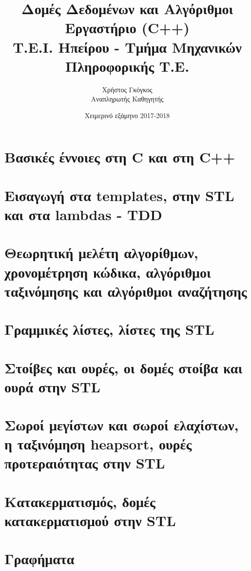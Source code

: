 \documentclass[11pt,a4paper]{book}
\title{Δομές Δεδομένων και Αλγόριθμοι \\ Εργαστήριο (C++)\\ Τ.Ε.Ι. Ηπείρου - Τμήμα Μηχανικών Πληροφορικής Τ.Ε.}
\author{Χρήστος Γκόγκος  \\ Αναπληρωτής Καθηγητής }
\date{Χειμερινό εξάμηνο 2017-2018}
\begin{document}
\frontmatter
\maketitle
\tableofcontents
\mainmatter

\chapter{Βασικές έννοιες στη C και στη C++}


\chapter{Εισαγωγή στα templates, στην STL και στα lambdas - TDD}


\chapter{Θεωρητική μελέτη αλγορίθμων, χρονομέτρηση κώδικα, αλγόριθμοι ταξινόμησης και αλγόριθμοι αναζήτησης}


\chapter{Γραμμικές λίστες, λίστες της STL}


\chapter{Στοίβες και ουρές, οι δομές στοίβα και ουρά στην STL}


\chapter{Σωροί μεγίστων και σωροί ελαχίστων, η ταξινόμηση heapsort, ουρές προτεραιότητας στην STL}


\chapter{Κατακερματισμός, δομές κατακερματισμού στην STL}


\chapter{Γραφήματα}




\begin{versionhistory}
\end{versionhistory}
\end{document}
